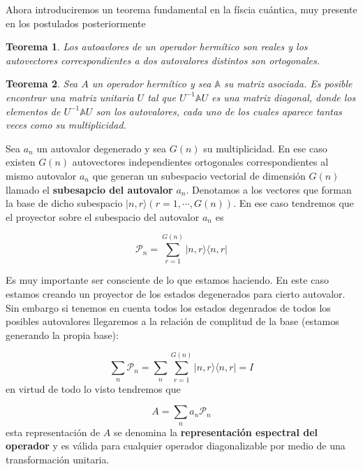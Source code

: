 \documentclass[12pt,a4paper]{book}
\numberwithin{equation}{chapter}
\numberwithin{figure}{chapter}
\newtheorem{theorem}{Teorema}[section]
\begin{document}
Ahora introduciremos un teorema fundamental en la físcia cuántica, muy presente en los postulados posteriormente

\begin{theorem}
Los autoavlores de un operador hermítico son reales y los autovectores correspondientes a dos autovalores distintos son ortogonales. 
\end{theorem}

\begin{theorem}
Sea $A$ un operador hermítico y sea $\mathbb{A}$ su matriz asociada. Es posible encontrar una matriz unitaria $U$ tal que $U^{-1} \mathbb{A} U$ es una matriz diagonal, donde los elementos de $U^{-1} \mathbb{A} U$ son los autovalores, cada uno de los cuales aparece tantas veces como su multiplicidad.
\end{theorem}

Sea $a_n$ un autovalor degenerado y sea $G(n)$ su multiplicidad. En ese caso existen $G(n)$ autovectores independientes ortogonales correspondientes al mismo autovalor $a_n$ que generan un subespacio vectorial de dimensión $G(n)$ llamado el \textbf{subesapcio del autovalor} $a_n$. Denotamos a los vectores que forman la base de dicho subespacio $|n,r \rangle (r=1, \cdots, G(n))$. En ese caso tendremos que el proyector sobre el subespacio del autovalor $a_n$ es

\begin{equation}
\mathcal{P}_n = \sum_{r=1}^{G(n)} | n , r \rangle \langle n , r |
\end{equation}

Es muy importante ser consciente de lo que estamos haciendo. En este caso estamos creando un proyector de los estados degenerados para cierto autovalor. Sin embargo si tenemos en cuenta todos los estados degenrados de todos los posibles autovalores llegaremos a la relación de complitud de la base (estamos generando la propia base):

\begin{equation}
\sum_n \mathcal{P}_n = \sum_n \sum_{r=1}^{G(n)} | n ,r \rangle \langle n,r| = I 
\end{equation}
en virtud de todo lo visto tendremos que

\begin{equation}
A = \sum_n a_n \mathcal{P}_n
\end{equation}
esta representación de $A$ se denomina la \textbf{representación espectral del operador} y es válida para cualquier operador diagonalizable por medio de una transformación unitaria.
\end{document}
